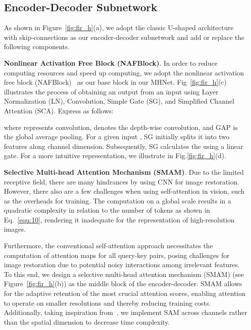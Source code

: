 \documentclass[lettersize,journal]{IEEEtran}
\begin{document}
\subsection{Encoder-Decoder Subnetwork}
As shown in Figure~\ref{fig:fir_h}(a), we adopt the classic U-shaped architecture with skip-connections as our encoder-decoder subnetwork and add or replace the following components. 
 
\noindent\textbf{Nonlinear Activation Free Block (NAFBlock)}. 
In order to reduce computing resources and speed up computing, we adopt the nonlinear activation free block (NAFBlock)~\cite{chen2022simple} as our base block in our MHNet. Fig~\ref{fig:fir_h}(c) illustrates the process of obtaining an output  from an input  using Layer Normalization (LN), Convolution, Simple Gate (SG), and Simplified Channel Attention (SCA). Express as follows:

where  represents  convolution,  denotes the  depth-wise convolution, and GAP is the global average pooling. For a given input , SG initially splits it into two features   along channel dimension. Subsequently, SG calculates the  using a linear gate.  For a more intuitive representation, we illustrate  in Fig.\ref{fig:fir_h}(d). 




\noindent\textbf{Selective Multi-head Attention Mechanism (SMAM)}. Due to the limited receptive field, there are many hindrances by using CNN for image restoration. However, there also are a few challenges when using self-attention in vision, such as the overheads for training. The computation on a global scale results in a quadratic complexity in relation to the number of tokens as shown in Eq.~\ref{equ:10}, rendering it inadequate for the representation of high-resolution images. 


Furthermore, the conventional self-attention approach necessitates the computation of attention maps for all query-key pairs, posing challenges for image restoration due to potential noisy interactions among irrelevant features.
To this end, we design  a  selective multi-head attention mechanism (SMAM) (see Figure~\ref{fig:fir_h}(b))  as the middle block of the encoder-decoder. SMAM allows for the adaptive retention of the most crucial attention scores, enabling attention to operate on smaller resolutions and thereby reducing training costs. Additionally, taking inspiration from~\cite{Zamir2021Restormer}, we implement SAM across channels rather than the spatial dimension to decrease time complexity.
\end{document}
